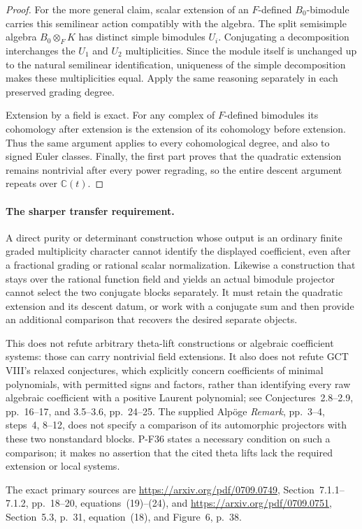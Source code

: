 \begin{proof}
For the more general claim, scalar extension of an $F$-defined
$B_0$-bimodule carries this semilinear action compatibly with
the algebra. The split semisimple algebra $B_0\otimes_F K$
has distinct simple bimodules $U_i$. Conjugating a decomposition
interchanges the $U_1$ and $U_2$ multiplicities. Since the module
itself is unchanged up to the natural semilinear identification,
uniqueness of the simple decomposition makes these multiplicities
equal. Apply the same reasoning separately in each preserved
grading degree.

Extension by a field is exact. For any complex of $F$-defined
bimodules its cohomology after extension is the extension of its
cohomology before extension. Thus the same argument applies to
every cohomological degree, and also to signed Euler classes.
Finally, the first part proves that the quadratic extension
remains nontrivial after every power regrading, so the entire
descent argument repeats over $\mathbb C(t)$.
\end{proof}

\paragraph{The sharper transfer requirement.}
A direct purity or determinant construction whose output is an
ordinary finite graded multiplicity character cannot identify
the displayed coefficient, even after a fractional grading or
rational scalar normalization. Likewise a construction that stays
over the rational function field and yields an actual bimodule
projector cannot select the two conjugate blocks separately.
It must retain the quadratic extension and its descent datum,
or work with a conjugate sum and then provide an additional
comparison that recovers the desired separate objects.

This does not refute arbitrary theta-lift constructions or
algebraic coefficient systems: those can carry nontrivial field
extensions. It also does not refute GCT VIII's relaxed conjectures,
which explicitly concern coefficients of minimal polynomials,
with permitted signs and factors, rather than identifying every
raw algebraic coefficient with a positive Laurent polynomial;
see Conjectures~2.8--2.9, pp.~16--17, and 3.5--3.6, pp.~24--25.
The supplied Alp\"oge \emph{Remark}, pp.~3--4, steps~4, 8--12,
does not specify a comparison of its automorphic projectors with
these two nonstandard blocks. P-F36 states a necessary condition
on such a comparison; it makes no assertion that the cited
theta lifts lack the required extension or local systems.

The exact primary sources are
\url{https://arxiv.org/pdf/0709.0749}, Section~7.1.1--7.1.2,
pp.~18--20, equations~(19)--(24), and
\url{https://arxiv.org/pdf/0709.0751}, Section~5.3, p.~31,
equation~(18), and Figure~6, p.~38.
